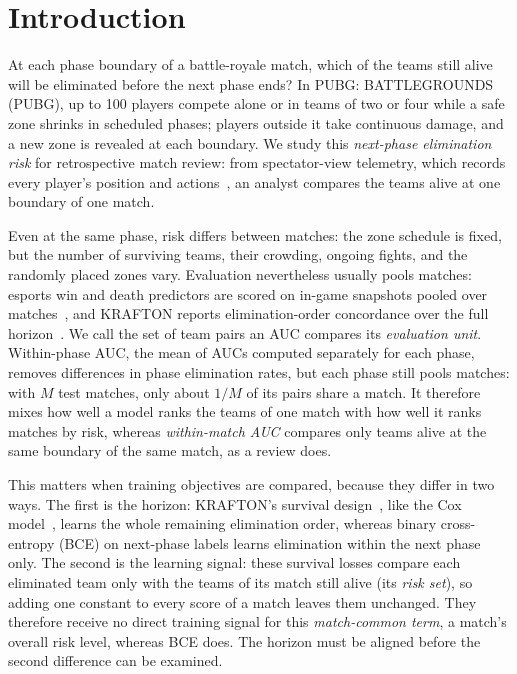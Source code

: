 \documentclass[sigconf,anonymous]{acmart}
\begin{document}
\section{Introduction}
\label{sec:introduction}
At each phase boundary of a battle-royale match, which of the teams still alive will be eliminated before the next phase ends? In PUBG: BATTLEGROUNDS (PUBG), up to 100 players compete alone or in teams of two or four while a safe zone shrinks in scheduled phases; players outside it take continuous damage, and a new zone is revealed at each boundary. We study this \emph{next-phase elimination risk} for retrospective match review: from spectator-view telemetry, which records every player's position and actions~\cite{PUBGAPI}, an analyst compares the teams alive at one boundary of one match.

Even at the same phase, risk differs between matches: the zone schedule is fixed, but the number of surviving teams, their crowding, ongoing fights, and the randomly placed zones vary. Evaluation nevertheless usually pools matches: esports win and death predictors are scored on in-game snapshots pooled over matches~\cite{Hodge21,Katona19,Marshall22}, and KRAFTON reports elimination-order concordance over the full horizon~\cite{KRAFTON}. We call the set of team pairs an AUC compares its \emph{evaluation unit}. Within-phase AUC, the mean of AUCs computed separately for each phase, removes differences in phase elimination rates, but each phase still pools matches: with $M$ test matches, only about $1/M$ of its pairs share a match. It therefore mixes how well a model ranks the teams of one match with how well it ranks matches by risk, whereas \emph{within-match AUC} compares only teams alive at the same boundary of the same match, as a review does.

This matters when training objectives are compared, because they differ in two ways. The first is the horizon: KRAFTON's survival design~\cite{KRAFTON}, like the Cox model~\cite{Cox72}, learns the whole remaining elimination order, whereas binary cross-entropy (BCE) on next-phase labels learns elimination within the next phase only. The second is the learning signal: these survival losses compare each eliminated team only with the teams of its match still alive (its \emph{risk set}), so adding one constant to every score of a match leaves them unchanged. They therefore receive no direct training signal for this \emph{match-common term}, a match's overall risk level, whereas BCE does. The horizon must be aligned before the second difference can be examined.
\end{document}
